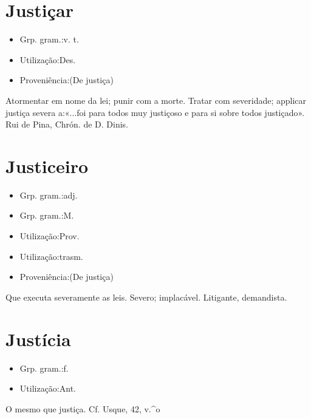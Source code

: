 \documentclass{article}
\begin{document}
\section{Justiçar}
\begin{itemize}
\item {Grp. gram.:v. t.}
\end{itemize}
\begin{itemize}
\item {Utilização:Des.}
\end{itemize}
\begin{itemize}
\item {Proveniência:(De \textunderscore justiça\textunderscore )}
\end{itemize}
Atormentar em nome da lei; punir com a morte.
Tratar com severidade; applicar justiça severa a:«\textunderscore ...foi para todos muy justiçoso e para si sobre todos justiçado\textunderscore ». Rui de Pina, \textunderscore Chrón. de D. Dinis\textunderscore .
\section{Justiceiro}
\begin{itemize}
\item {Grp. gram.:adj.}
\end{itemize}
\begin{itemize}
\item {Grp. gram.:M.}
\end{itemize}
\begin{itemize}
\item {Utilização:Prov.}
\end{itemize}
\begin{itemize}
\item {Utilização:trasm.}
\end{itemize}
\begin{itemize}
\item {Proveniência:(De \textunderscore justiça\textunderscore )}
\end{itemize}
Que executa severamente as leis.
Severo; implacável.
Litigante, demandista.
\section{Justícia}
\begin{itemize}
\item {Grp. gram.:f.}
\end{itemize}
\begin{itemize}
\item {Utilização:Ant.}
\end{itemize}
O mesmo que \textunderscore justiça\textunderscore . Cf. Usque, 42, v.^o
\end{document}
